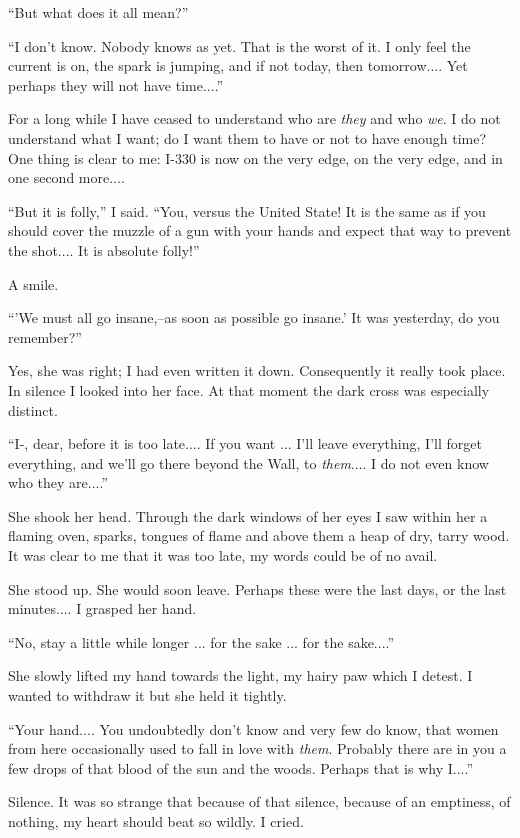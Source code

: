 \documentclass[11pt,openany]{book}
\begin{document}
``But what does it all mean?''

``I don't know. Nobody knows as yet. That is the worst of it. I only feel the current is on, the spark is jumping, and if not today, then tomorrow.... Yet perhaps they will not have time....''

For a long while I have ceased to understand who are \emph{they} and who \emph{we}. I do not understand what I want; do I want them to have or not to have enough time? One thing is clear to me: I-330 is now on the very edge, on the very edge, and in one second more....

``But it is folly,'' I said. ``You, versus the United State! It is the same as if you should cover the muzzle of a gun with your hands and expect that way to prevent the shot.... It is absolute folly!''

A smile.

``'We must all go insane,--as soon as possible go insane.' It was yesterday, do you remember?''

Yes, she was right; I had even written it down. Consequently it really took place. In silence I looked into her face. At that moment the dark cross was especially distinct.

``I-, dear, before it is too late.... If you want ... I'll leave everything, I'll forget everything, and we'll go there beyond the Wall, to \emph{them}.... I do not even know who they are....''

She shook her head. Through the dark windows of her eyes I saw within her a flaming oven, sparks, tongues of flame and above them a heap of dry, tarry wood. It was clear to me that it was too late, my words could be of no avail.

She stood up. She would soon leave. Perhaps these were the last days, or the last minutes.... I grasped her hand.

``No, stay a little while longer ... for the sake ... for the sake....''

She slowly lifted my hand towards the light, my hairy paw which I detest. I wanted to withdraw it but she held it tightly.

``Your hand.... You undoubtedly don't know and very few do know, that women from here occasionally used to fall in love with \emph{them}. Probably there are in you a few drops of that blood of the sun and the woods. Perhaps that is why I....''

Silence. It was so strange that because of that silence, because of an emptiness, of nothing, my heart should beat so wildly. I cried.
\end{document}
